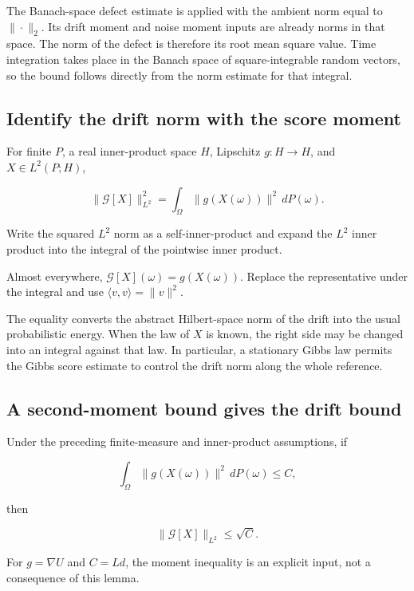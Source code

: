 \documentclass[11pt,a4paper]{report}
\begin{document}
The Banach-space defect estimate is applied with the ambient norm equal to \(\|\cdot\|_2\). Its drift moment and noise moment inputs are already norms in that space. The norm of the defect is therefore its root mean square value. Time integration takes place in the Banach space of square-integrable random vectors, so the bound follows directly from the norm estimate for that integral.

\subsection{\texorpdfstring{Identify the drift norm with the score moment}{Identify the drift norm with the score moment}}
\label{report-step-UnadjustedLangevin-LpDrift-lean-9}


For finite \(P\), a real inner-product space \(H\), Lipschitz \(g:H\to H\), and \(X\in L^2(P;H)\),

\[\|\mathcal G[X]\|_{L^2}^2=\int_\Omega\|g(X(\omega))\|^2\,dP(\omega).\]

Write the squared \(L^2\) norm as a self-inner-product and expand the \(L^2\) inner product into the integral of the pointwise inner product.



Almost everywhere, \(\mathcal G[X](\omega)=g(X(\omega))\). Replace the representative under the integral and use \(\langle v,v\rangle=\|v\|^2\).



The equality converts the abstract Hilbert-space norm of the drift into the usual probabilistic energy. When the law of \(X\) is known, the right side may be changed into an integral against that law. In particular, a stationary Gibbs law permits the Gibbs score estimate to control the drift norm along the whole reference.

\subsection{\texorpdfstring{A second-moment bound gives the drift bound}{A second-moment bound gives the drift bound}}
\label{report-step-UnadjustedLangevin-LpDrift-lean-10}


Under the preceding finite-measure and inner-product assumptions, if

\[\int_\Omega\|g(X(\omega))\|^2\,dP(\omega)\le C,\]

then

\[\|\mathcal G[X]\|_{L^2}\le\sqrt C.\]

For \(g=\nabla U\) and \(C=Ld\), the moment inequality is an explicit input, not a consequence of this lemma.
\end{document}

